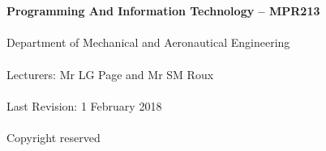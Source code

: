 \begin{titlepage}
    \thispagestyle{empty}
    \\~\\[18cm]
    \large
    \textbf{Programming And Information Technology -- MPR213} \\~\\
    Department of Mechanical and Aeronautical Engineering \\~\\[0.5cm]
    \normalsize
    Lecturers: Mr LG Page and  Mr SM Roux \\~\\
    Last Revision: 1 February 2018 \\~\\[0.5em]
    \textcopyright \quad Copyright reserved \\~\\
\end{titlepage}
\restoregeometry
